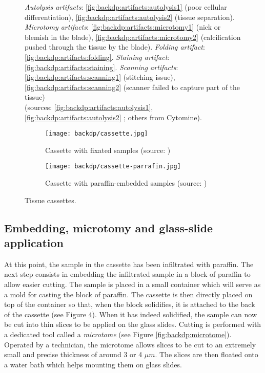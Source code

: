 \begin{figure}
  \caption{\textit{Autolysis artifacts}: \ref{fig:backdp:artifacts:autolysis1} (poor cellular differentiation), \ref{fig:backdp:artifacts:autolysis2} (tissue separation). \textit{Microtomy artifacts}: \ref{fig:backdp:artifacts:microtomy1} (nick or blemish in the blade), \ref{fig:backdp:artifacts:microtomy2} (calcification pushed through the tissue by the blade). \textit{Folding artifact}: \ref{fig:backdp:artifacts:folding}. \textit{Staining artifact}: \ref{fig:backdp:artifacts:staining}. \textit{Scanning artifacts}: \ref{fig:backdp:artifacts:scanning1} (stitching issue), \ref{fig:backdp:artifacts:scanning2} (scanner failed to capture part of the tissue) \\ (sources: \ref{fig:backdp:artifacts:autolysis1}, \ref{fig:backdp:artifacts:autolysis2} \cite{taqi2018review}; others from Cytomine).}
  \label{fig:backdp:artifacts:all}
\end{figure}

\begin{figure}
  \centering
  \begin{subfigure}[t]{0.48\textwidth}
    \centering
    \texttt{[image: backdp/cassette.jpg]}
    \caption{Cassette with fixated samples (source: \cite{stidworthy2011getting})}
    \label{fig:backdp:cassette}
  \end{subfigure}\quad
  \begin{subfigure}[t]{0.48\textwidth}
    \centering
    \texttt{[image: backdp/cassette-parrafin.jpg]}
    \caption{Cassette with paraffin-embedded samples (source: \cite{img:cassetteparrafin})}
    \label{fig:backdp:cassette-paraffin}
  \end{subfigure}
  \caption{Tissue cassettes.}
\end{figure}

\subsection{Embedding, microtomy and glass-slide application}
\label{ssec:backdp:embedding}

At this point, the sample in the cassette has been infiltrated with paraffin. The next step consists in embedding the infiltrated sample in a block of paraffin to allow easier cutting. The sample is placed in a small container which will serve as a mold for casting the block of paraffin. The cassette is then directly placed on top of the container so that, when the block solidifies, it is attached to the back of the cassette (see Figure \ref{fig:backdp:cassette-paraffin}). When it has indeed solidified, the sample can now be cut into thin slices to be applied on the glass slides. Cutting is performed with a dedicated tool called a \textit{microtome} (see Figure \ref{fig:backdp:microtome}). Operated by a technician, the microtome allows slices to be cut to an extremely small and precise thickness of around 3 or 4 $\mu m$. The slices are then floated onto a water bath which helps mounting them on glass slides. 

